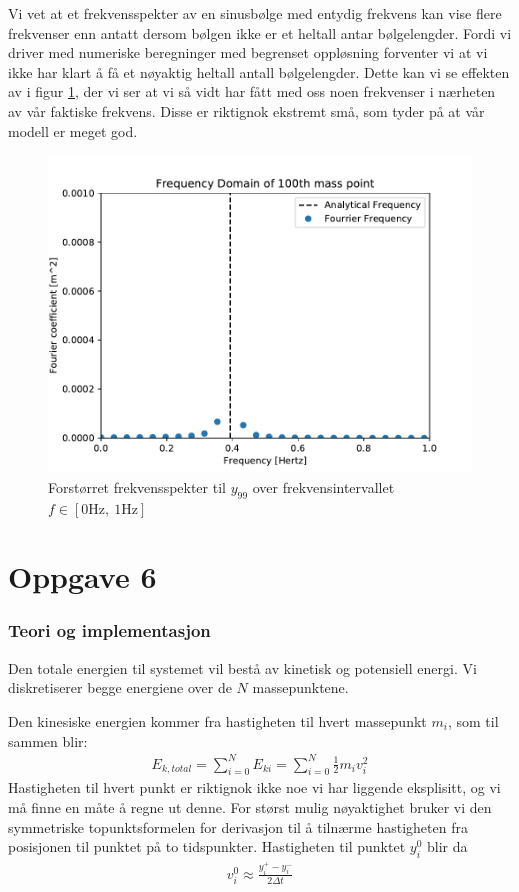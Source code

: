 \documentclass[12p,a4paper]{report}
\begin{document}
Vi vet at et frekvensspekter av en sinusbølge med entydig frekvens kan vise flere frekvenser enn antatt dersom bølgen ikke er et heltall antar bølgelengder. Fordi vi driver med numeriske beregninger med begrenset oppløsning forventer vi at vi ikke har klart å få et nøyaktig heltall antall bølgelengder. Dette kan vi se effekten av i figur \ref{fig:100_point_fourier2}, der vi ser at vi så vidt har fått med oss noen frekvenser i nærheten av vår faktiske frekvens. Disse er riktignok ekstremt små, som tyder på at vår modell er meget god.
\begin{figure}[H]
\centering
\includegraphics[width=\textwidth]{../fig/100_point_fourier2.pdf}
\caption{Forstørret frekvensspekter til $y_{99}$ over frekvensintervallet $f\in [0\mathrm{Hz},\ 1\mathrm{Hz}]$}
\label{fig:100_point_fourier2}
\end{figure}




\section*{Oppgave 6}
\subsubsection*{Teori og implementasjon}
Den totale energien til systemet vil bestå av kinetisk og potensiell energi. Vi diskretiserer begge energiene over de $N$ massepunktene.

Den kinesiske energien kommer fra hastigheten til hvert massepunkt $m_i$, som til sammen blir:
\begin{align*}
E_{k,total} = \sum\limits_{i=0}^{N} E_{ki} = \sum\limits_{i=0}^{N}\frac{1}{2}m_i v_i^2
\end{align*}
Hastigheten til hvert punkt er riktignok ikke noe vi har liggende eksplisitt, og vi må finne en måte å regne ut denne. For størst mulig nøyaktighet bruker vi den symmetriske topunktsformelen for derivasjon til å tilnærme hastigheten fra posisjonen til punktet på to tidspunkter. Hastigheten til punktet $y_i^0$ blir da
\begin{align*}
v_i^0 \approx \frac{y_i^+ - y_i^-}{2\Delta t}
\end{align*}
\end{document}
